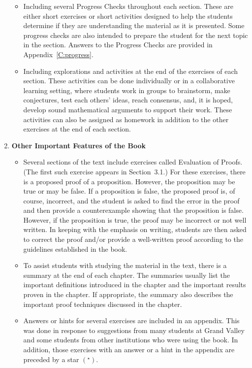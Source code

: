 \begin{enumerate}
\begin{itemize}
\item Including several Progress Checks throughout each section.  These are either short exercises or short activities designed to help the students determine if they are understanding the material as it is presented.  Some progress checks are also intended to prepare the student for the next topic in the section.  Answers to the Progress Checks are provided in Appendix~\ref{C:progress}.

\item Including explorations and activities at the end of the exercises of each section.  These activities can be done individually or in a collaborative learning setting, where students work in groups to brainstorm, make conjectures, test each others' ideas, reach consensus, and, it is hoped, develop sound mathematical arguments to support their work.  These activities can also be assigned as homework in addition to the other exercises at the end of each section.
\end{itemize}


\item \textbf{Other Important Features of the Book}
\begin{itemize}
\item Several sections of the text include exercises called Evaluation of Proofs.  (The first such exercise appears in Section~3.1.)  For these exercises, there is a proposed proof of a proposition.  However, the proposition may be true or may be false.  If a proposition is false, the proposed proof is, of course, incorrect, and the student is asked to find the error in the proof and then provide a counterexample showing that the proposition is false.  However, if the proposition is true, the proof may be incorrect or not well written.  In keeping with the emphasis on writing, students are then asked to correct the proof and/or provide a well-written proof according to the guidelines established in the book.

\item To assist students with studying the material in the text, there is a summary at the end of each chapter.  The summaries usually list the important definitions introduced in the chapter and the important results proven in the chapter.  If appropriate, the summary also describes the important proof techniques discussed in the chapter.

\item Answers or hints for several exercises are included in an appendix.  This was done in response to suggestions from many students at Grand Valley and some students from other institutions who were using the book.  In addition, those exercises with an answer or a hint in the appendix are preceded by a star 
$\left( ^\star \right)$.
\end{itemize}



\end{enumerate}
